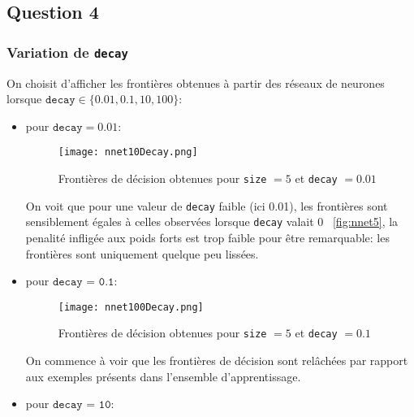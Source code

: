 \documentclass{article}
\begin{document}
\begin{multicols}{2}
\subsection{Question 4}\label{subsec:ex24}

\subsubsection{Variation de \texttt{decay}}\label{subsubsec:ex241}

On choisit d'afficher les frontières obtenues à partir des réseaux de neurones
lorsque $\texttt{decay} \in \{ 0.01, 0.1, 10, 100 \}$:

\begin{itemize}
    \item pour $\texttt{decay} = 0.01$:
        \begin{figure}[H]
            \begin{center}
                \texttt{[image: nnet10Decay.png]}
                \centering
                \captionsetup{justification=centering}
                \caption{\label{fig:0.01Decay}Frontières de décision obtenues pour \texttt{size} $= 5$ et \texttt{decay} $= 0.01$}
            \end{center}
        \end{figure}
        On voit que pour une valeur de \texttt{decay} faible (ici 0.01), les
        frontières sont sensiblement égales à celles observées lorsque
        \texttt{decay} valait 0 ~\ref{fig:nnet5}, la penalité infligée aux
        poids forts est trop faible pour être remarquable: les frontières sont
        uniquement quelque peu lissées.
    \item pour $\texttt{decay = 0.1}$:
        \begin{figure}[H]
            \begin{center}
                \texttt{[image: nnet100Decay.png]}
                \centering
                \captionsetup{justification=centering}
                \caption{\label{fig:0.1Decay}Frontières de décision obtenues pour \texttt{size} $= 5$ et \texttt{decay} $= 0.1$}
            \end{center}
        \end{figure}
        On commence à voir que les frontières de décision sont relâchées par
        rapport aux exemples présents dans l'ensemble d'apprentissage.
    \item pour $\texttt{decay = 10}$:
        \begin{figure}[H]

\end{figure}
\end{itemize}
\end{multicols}
\end{document}
